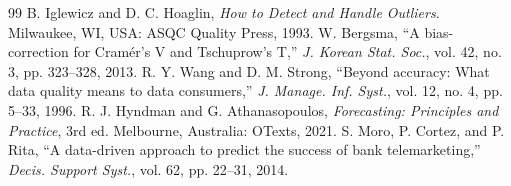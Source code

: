 \documentclass[conference]{IEEEtran}
\begin{document}
\begin{thebibliography}{99}
 B. Iglewicz and D. C. Hoaglin, \emph{How to Detect and Handle Outliers}. Milwaukee, WI, USA: ASQC Quality Press, 1993.
 W. Bergsma, ``A bias-correction for Cram\'er's V and Tschuprow's T,'' \emph{J. Korean Stat. Soc.}, vol. 42, no. 3, pp. 323--328, 2013.
 R. Y. Wang and D. M. Strong, ``Beyond accuracy: What data quality means to data consumers,'' \emph{J. Manage. Inf. Syst.}, vol. 12, no. 4, pp. 5--33, 1996.
 R. J. Hyndman and G. Athanasopoulos, \emph{Forecasting: Principles and Practice}, 3rd ed. Melbourne, Australia: OTexts, 2021.
 S. Moro, P. Cortez, and P. Rita, ``A data-driven approach to predict the success of bank telemarketing,'' \emph{Decis. Support Syst.}, vol. 62, pp. 22--31, 2014.
\end{thebibliography}
\end{document}
